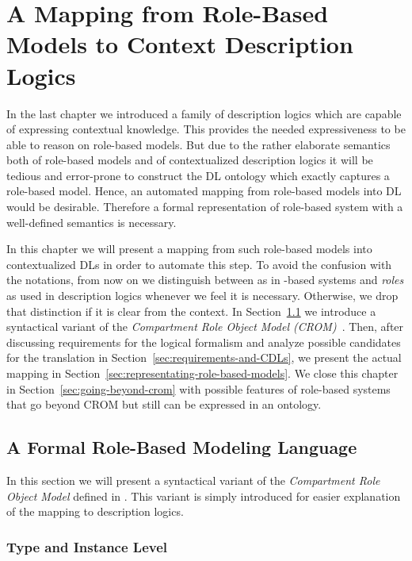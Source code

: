 
\chapter{A Mapping from Role-Based Models to Context Description Logics}
\label{cha:mapping}

In the last chapter we introduced a family of description logics which are capable of expressing
contextual knowledge. This provides the needed expressiveness to be able to reason on role-based
models. But due to the rather elaborate semantics both of role-based models and of contextualized
description logics it will be tedious and error-prone to construct the DL ontology which exactly
captures a role-based model. Hence, an automated mapping from role-based models into DL would be
desirable. Therefore a formal representation of role-based system with a well-defined semantics is
necessary.

In this chapter we will present a mapping from such role-based models into contextualized DLs in
order to automate this step.
%
To avoid the confusion with the notations, from now on we distinguish between \emph{\rosiroles} as
in \rosirole-based systems and \emph{roles} as used in description logics whenever we feel it is
necessary. Otherwise, we drop that distinction if it is clear from the context.
%
In Section~\ref{sec:sigma-crom} we introduce a syntactical variant of the \emph{Compartment Role
  Object Model (CROM)}~\cite{KBG-SLE15}.  Then, after discussing requirements for the logical
formalism and analyze possible candidates for the translation in
Section~\ref{sec:requirements-and-CDLs}, we present the actual mapping in
Section~\ref{sec:representating-role-based-models}. We close this chapter in
Section~\ref{sec:going-beyond-crom} with possible features of role-based systems that go beyond CROM
but still can be expressed in an ontology.



\section{A Formal Role-Based Modeling Language}
\label{sec:sigma-crom}


In this section we will present a syntactical variant of the \emph{Compartment Role Object Model}
defined in \cite{KBG-SLE15}. This variant is simply introduced for easier
explanation of the mapping to description logics.

\subsection{Type and Instance Level}
\label{sec:type-instance-level}

